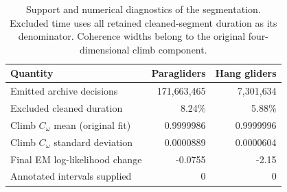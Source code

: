 \begin{table}[tb]
\centering\small
\caption{Support and numerical diagnostics of the segmentation. Excluded time uses all retained cleaned-segment duration as its denominator. Coherence widths belong to the original four-dimensional climb component.}
\label{tab:segmentationaudit}
\begin{tabular}{lrr}
\toprule
Quantity & Paragliders & Hang gliders \\
\midrule
Emitted archive decisions & 171{,}663{,}465 & 7{,}301{,}634 \\
Excluded cleaned duration & 8.24\% & 5.88\% \\
Climb $C_\omega$ mean (original fit) & 0.9999986 & 0.9999996 \\
Climb $C_\omega$ standard deviation & 0.0000889 & 0.0000604 \\
Final EM log-likelihood change & -0.0755 & -2.15 \\
Annotated intervals supplied & 0 & 0 \\
\bottomrule
\end{tabular}
\end{table}
